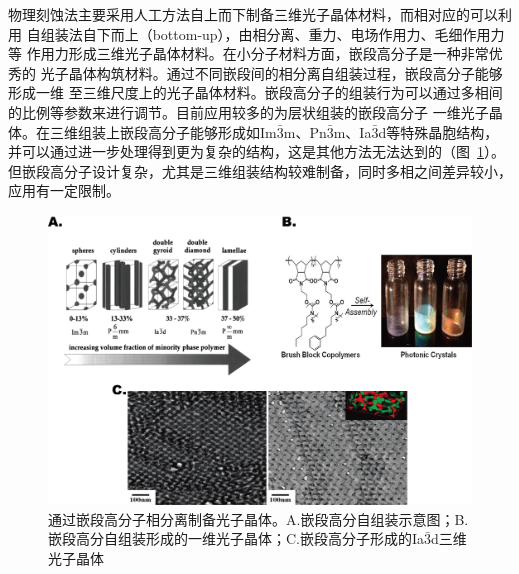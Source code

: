 物理刻蚀法主要采用人工方法自上而下制备三维光子晶体材料，而相对应的可以利用
自组装法自下而上（bottom-up），由相分离、重力、电场作用力、毛细作用力等
作用力形成三维光子晶体材料。在小分子材料方面，嵌段高分子是一种非常优秀的
光子晶体构筑材料。通过不同嵌段间的相分离自组装过程，嵌段高分子能够形成一维
至三维尺度上的光子晶体材料\cite{Fink1999Block}。嵌段高分子的组装行为可以通过多相间的比例等参数来进行调节。目前应用较多的为层状组装的嵌段高分子
一维光子晶体\cite{Kang2009Full,Miyake2012Synthesis}。在三维组装上嵌段高分子能够形成如Im${\bar 3}$m、Pn${\bar 3}$m、Ia${\bar 3}$d等特殊晶胞结构，并可以通过进一步处理得到更为复杂的结构\cite{Hsueh2010Inorganic,Hsueh2014Shifting}，这是其他方法无法达到的（图~\ref{fig:copol}）。但嵌段高分子设计复杂，尤其是三维组装结构较难制备，同时多相之间差异较小，应用有一定限制。
\begin{figure}[htbp]
	\centering
	\includegraphics[width=0.8\linewidth]{figures/copol.png}
	\caption{通过嵌段高分子相分离制备光子晶体。A.嵌段高分自组装示意图\cite{Fink1999Block}；B.嵌段高分自组装形成的一维光子晶体\cite{Miyake2012Synthesis}；C.嵌段高分子形成的Ia${\bar 3}$d三维光子晶体\cite{Hsueh2010Inorganic}}
	\label{fig:copol}
\end{figure}

